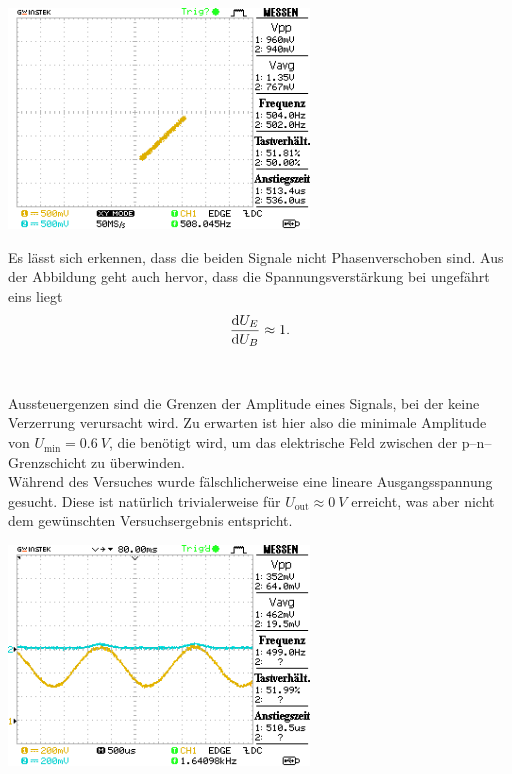 \documentclass[10pt]{article}
\newenvironment{Figure}
  {\par\medskip\noindent\minipage{\linewidth}}
  {\endminipage\par\medskip}
\begin{document}
\begin{multicols}{2}
\begin{Figure}
                \centering
                \includegraphics[width=0.6\textwidth]{../data/DS0003.png}
        \end{Figure}
        Es lässt sich erkennen, dass die beiden Signale nicht Phasenverschoben sind.
        Aus der Abbildung geht auch hervor, dass die Spannungsverstärkung bei ungefährt eins liegt
        \begin{align} 
                \diff[]{U_E}{U_B}\approx 1
        .\end{align}\\\\
        Aussteuergenzen sind die Grenzen der Amplitude eines Signals, bei der keine Verzerrung verursacht wird.
        Zu erwarten ist hier also die minimale Amplitude von $U_{\text{min}}=\SI{0.6}{V}$, die benötigt wird, um das elektrische Feld zwischen der p--n--Grenzschicht zu überwinden.
        \\\indent Während des Versuches wurde fälschlicherweise eine lineare Ausgangsspannung gesucht.
        Diese ist natürlich trivialerweise für $U_{\text{out}}\approx \SI{0}{V}$ erreicht, was aber nicht dem gewünschten Versuchsergebnis entspricht.
        \begin{Figure}
                \centering
                \includegraphics[width=0.6\textwidth]{../data/DS0005.png}

\end{Figure}
\end{multicols}
\end{document}
